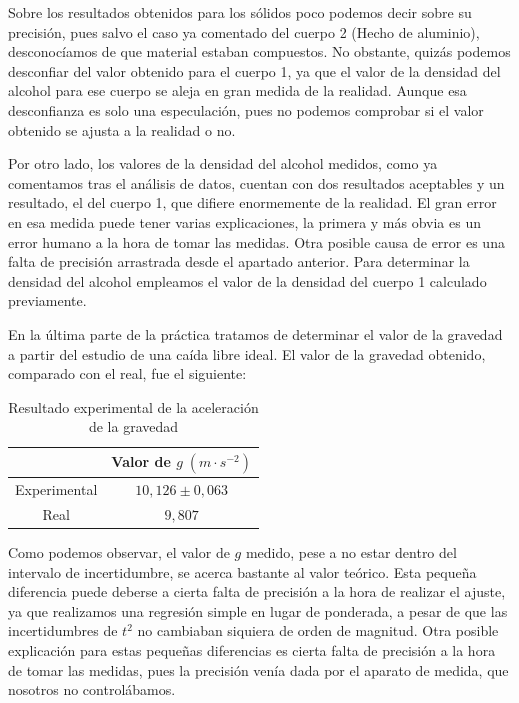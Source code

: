 \documentclass[a4paper,12pt,titlepage]{report}
\begin{document}
\newpage

Sobre los resultados obtenidos para los sólidos poco podemos decir sobre su precisión, pues salvo el caso ya comentado del cuerpo 2 (Hecho de aluminio), desconocíamos de que material estaban compuestos. No obstante, quizás podemos desconfiar del valor obtenido para el cuerpo 1, ya que el valor de la densidad del alcohol para ese cuerpo se aleja en gran medida de la realidad. Aunque esa desconfianza es solo una especulación, pues no podemos comprobar si el valor obtenido se ajusta a la realidad o no.

\par Por otro lado, los valores de la densidad del alcohol medidos, como ya comentamos tras el análisis de datos, cuentan con dos resultados aceptables y un resultado, el del cuerpo 1, que difiere enormemente de la realidad. El gran error en esa medida puede tener varias explicaciones, la primera y más obvia es un error humano a la hora de tomar las medidas. Otra posible causa de error es una falta de precisión arrastrada desde el apartado anterior. Para determinar la densidad del alcohol empleamos el valor de la densidad del cuerpo 1 calculado previamente.

\par En la última parte de la práctica tratamos de determinar el valor de la gravedad a partir del estudio de una caída libre ideal. El valor de la gravedad obtenido, comparado con el real, fue el siguiente:

\begin{table}[h!]
    \centering
    \begin{tabular}{c|c|}
    \cline{2-2}
                           & Valor de $g \; (m\cdot s^{-2})$\\ \hline
    \multicolumn{1}{|c|}{Experimental} &  $10,126 \pm 0,063$\\ \hline
    \multicolumn{1}{|c|}{Real} & $9,807$ \\ \hline
    \end{tabular}
    \caption{Resultado experimental de la aceleración de la gravedad}
    \label{tab:my-tabled}
    \end{table}

Como podemos observar, el valor de $g$ medido, pese a no estar dentro del intervalo de incertidumbre, se acerca bastante al valor teórico. Esta pequeña diferencia puede deberse a cierta falta de precisión a la hora de realizar el ajuste, ya que realizamos una regresión simple en lugar de ponderada, a pesar de que las incertidumbres de $t^2$ no cambiaban siquiera de orden de magnitud. Otra posible explicación para estas pequeñas diferencias es cierta falta de precisión a la hora de tomar las medidas, pues la precisión venía dada por el aparato de medida, que nosotros no controlábamos.
\end{document}
